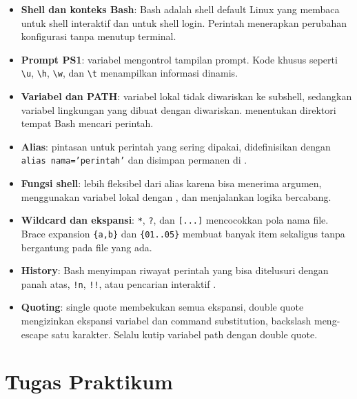 \begin{itemize}[noitemsep,topsep=2pt]
    \item \textbf{Shell dan konteks Bash}: Bash adalah shell default Linux
          yang membaca  untuk shell interaktif dan
           untuk shell login. Perintah 
          menerapkan perubahan konfigurasi tanpa menutup terminal.
    \item \textbf{Prompt PS1}: variabel  mengontrol tampilan
          prompt. Kode khusus seperti \texttt{\textbackslash u},
          \texttt{\textbackslash h}, \texttt{\textbackslash w}, dan
          \texttt{\textbackslash t} menampilkan informasi dinamis.
    \item \textbf{Variabel dan PATH}: variabel lokal tidak diwariskan ke
          subshell, sedangkan variabel lingkungan yang dibuat dengan
           diwariskan.  menentukan direktori tempat
          Bash mencari perintah.
    \item \textbf{Alias}: pintasan untuk perintah yang sering dipakai,
          didefinisikan dengan \texttt{alias nama='perintah'} dan
          disimpan permanen di .
    \item \textbf{Fungsi shell}: lebih fleksibel dari alias karena bisa
          menerima argumen, menggunakan variabel lokal dengan ,
          dan menjalankan logika bercabang.
    \item \textbf{Wildcard dan ekspansi}: \texttt{*}, \texttt{?}, dan
          \texttt{[...]} mencocokkan pola nama file. Brace expansion
          \texttt{\{a,b\}} dan \texttt{\{01..05\}} membuat banyak item
          sekaligus tanpa bergantung pada file yang ada.
    \item \textbf{History}: Bash menyimpan riwayat perintah yang bisa
          ditelusuri dengan panah atas, \texttt{!n}, \texttt{!!}, atau
          pencarian interaktif .
    \item \textbf{Quoting}: single quote membekukan semua ekspansi, double
          quote mengizinkan ekspansi variabel dan command substitution,
          backslash meng-escape satu karakter. Selalu kutip variabel path
          dengan double quote.
\end{itemize}

\section{Tugas Praktikum}
\label{sec:tugas-praktikum-bash-shell}

